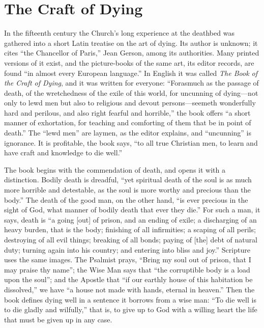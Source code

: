 \section{The Craft of Dying}

In the fifteenth century the Church's long experience at the deathbed was gathered into a short Latin treatise on the art of dying. Its author is unknown; it cites ``the Chancellor of Paris,'' Jean Gerson, among its authorities. Many printed versions of it exist, and the picture-books of the same art, its editor records, are found ``in almost every European language.'' In English it was called \emph{The Book of the Craft of Dying}, and it was written for everyone: ``Forasmuch as the passage of death, of the wretchedness of the exile of this world, for uncunning of dying---not only to lewd men but also to religious and devout persons---seemeth wonderfully hard and perilous, and also right fearful and horrible,'' the book offers ``a short manner of exhortation, for teaching and comforting of them that be in point of death.'' The ``lewd men'' are laymen, as the editor explains, and ``uncunning'' is ignorance. It is profitable, the book says, ``to all true Christian men, to learn and have craft and knowledge to die well.''

The book begins with the commendation of death, and opens it with a distinction. Bodily death is dreadful, ``yet spiritual death of the soul is as much more horrible and detestable, as the soul is more worthy and precious than the body.'' The death of the good man, on the other hand, ``is ever precious in the sight of God, what manner of bodily death that ever they die.'' For such a man, it says, death is ``a going [out] of prison, and an ending of exile; a discharging of an heavy burden, that is the body; finishing of all infirmities; a scaping of all perils; destroying of all evil things; breaking of all bonds; paying of [the] debt of natural duty; turning again into his country; and entering into bliss and joy.'' Scripture uses the same images. The Psalmist prays, ``Bring my soul out of prison, that I may praise thy name''; the Wise Man says that ``the corruptible body is a load upon the soul''; and the Apostle that ``if our earthly house of this habitation be dissolved,'' we have ``a house not made with hands, eternal in heaven.'' Then the book defines dying well in a sentence it borrows from a wise man: ``To die well is to die gladly and wilfully,'' that is, to give up to God with a willing heart the life that must be given up in any case.

